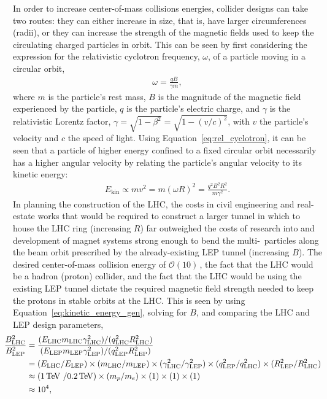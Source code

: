 In order to increase center-of-mass collisions energies, collider designs can take two routes: they can
either increase in size, that is, have larger circumferences (radii), or they can increase the strength of the magnetic
fields used to keep the circulating charged particles in orbit. This can be seen by first considering the expression
for the relativistic cyclotron frequency, $\omega$, of a particle moving in a circular orbit,
\begin{align}
    \omega = \frac{qB}{\gamma m},
    \label{eq:rel_cyclotron}
\end{align}
where $m$ is the particle's rest mass, $B$ is the magnitude of the magnetic field experienced by the
particle, $q$ is the particle's electric charge, and $\gamma$ is the relativistic Lorentz factor, $\gamma = \sqrt{1 - \beta^2} = \sqrt{1 - (v/c)^2}$,
with $v$ the particle's velocity and $c$ the speed of light.
Using Equation~\ref{eq:rel_cyclotron}, it can be seen that a particle of higher energy confined to a fixed
circular orbit necessarily has a higher angular velocity by relating the particle's angular
velocity to its kinetic energy:
\begin{align}
    E_{\text{kin}} \propto m v^2 = m(\omega R)^2 = \frac{q^2 B^2 R^2}{m \gamma^2}.
    \label{eq:kinetic_energy_gen}
\end{align}
In planning the construction of the LHC, the costs in civil engineering and real-estate works that would
be required to construct a larger tunnel in which to house the LHC ring (increasing $R$) far outweighed
the costs of research into and development of magnet systems strong enough to bend the
multi-\TeV~particles along the beam orbit prescribed by the already-existing LEP tunnel (increasing $B$).
The desired center-of-mass collision energy of $\mathcal{O}(10)$\,\TeV, the fact that the LHC would be a hadron (proton)
collider, and the fact that the LHC would be using the existing LEP tunnel dictate the required magnetic
field strength needed to keep the protons in stable orbits at the LHC. This
is seen by using Equation~\ref{eq:kinetic_energy_gen}, solving for $B$, and comparing the LHC and LEP
design parameters,
\begin{align}
    \hspace{-0.4cm}
    \frac{B^2_{\text{LHC}}}{B^2_\text{LEP}} &= \frac{ (E_{\text{LHC}} m_{\text{LHC}} \gamma_{\text{LHC}}^2) / (q_{\text{LHC}}^2 R_{\text{LHC}}^2)  } { (E_{\text{LEP}} m_{\text{LEP}} \gamma_{\text{LEP}}^2) / (q_{\text{LEP}}^2 R_{\text{LEP}}^2) } \label{eq:lhc_mag_field} \\
        &= (E_{\text{LHC}} / E_{\text{LEP}}) \times (m_{\text{LHC}} / m_{\text{LEP}}) \times (\gamma_{\text{LHC}}^2 / \gamma_{\text{LEP}}^2) \times (q_{\text{LEP}}^2 / q_{\text{LHC}}^2) \times (R_{\text{LEP}}^2 / R_{\text{LHC}}^2) \notag \\
        &\approx ( 1\,\TeV~/0.2\,\TeV) \times (m_p/ m_e) \times (1) \times (1) \times (1) \notag \\
        &\approx 10^4 \notag,
\end{align}
